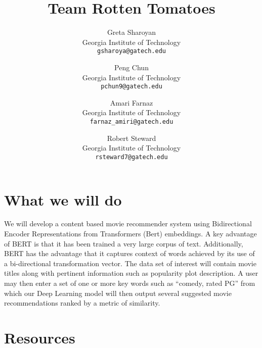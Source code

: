 \documentclass[10pt,twocolumn,letterpaper]{article}
\begin{document}
\title{Team Rotten Tomatoes}

\author{Greta Sharoyan\\
Georgia Institute of Technology\\
{\tt\small gsharoya@gatech.edu}
\and
Peng Chun\\
Georgia Institute of Technology\\
{\tt\small pchun9@gatech.edu}\\
\and
Amari Farnaz\\
Georgia Institute of Technology\\
{\tt\small farnaz\_amiri@gatech.edu}
\and
Robert Steward\\
Georgia Institute of Technology\\
{\tt\small rsteward7@gatech.edu}
}

\maketitle



\section{What we will do}
We will develop a content based movie recommender system using Bidirectional Encoder Representations from Transformers (Bert) embeddings.    A key advantage of BERT is that it has been trained a very large corpus of text.  Additionally, BERT has the advantage that it captures context of words achieved by its use of a bi-directional transformation vector.  The data set of interest will contain movie titles along with pertinent information such as popularity plot description.  A user may then enter a set of one or more key words such as “comedy, rated PG” from which our Deep Learning model will then output several suggested movie recommendations ranked by a metric of similarity.

\section{Resources}
\end{document}
